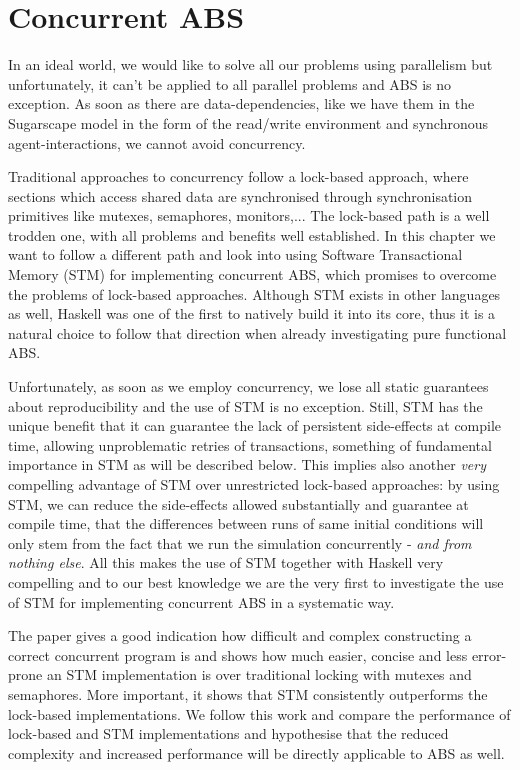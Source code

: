 \section{Concurrent ABS}
In an ideal world, we would like to solve all our problems using parallelism but unfortunately, it can't be applied to all parallel problems and ABS is no exception. As soon as there are data-dependencies, like we have them in the Sugarscape model in the form of the read/write environment and synchronous agent-interactions, we cannot avoid concurrency.

Traditional approaches to concurrency follow a lock-based approach, where sections which access shared data are synchronised through synchronisation primitives like mutexes, semaphores, monitors,... The lock-based path is a well trodden one, with all problems and benefits well established. In this chapter we want to follow a different path and look into using Software Transactional Memory (STM) for implementing concurrent ABS, which promises to overcome the problems of lock-based approaches. Although STM exists in other languages as well, Haskell was one of the first to natively build it into its core, thus it is a natural choice to follow that direction when already investigating pure functional ABS.

Unfortunately, as soon as we employ concurrency, we lose all static guarantees about reproducibility and the use of STM is no exception. Still, STM has the unique benefit that it can guarantee the lack of persistent side-effects at compile time, allowing unproblematic retries of transactions, something of fundamental importance in STM as will be described below. This implies also another \textit{very} compelling advantage of STM over unrestricted lock-based approaches: by using STM, we can reduce the side-effects allowed substantially and guarantee at compile time, that the differences between runs of same initial conditions will only stem from the fact that we run the simulation concurrently - \textit{and from nothing else}. All this makes the use of STM together with Haskell very compelling and to our best knowledge we are the very first to investigate the use of STM for implementing concurrent ABS in a systematic way.

The paper \cite{discolo_lock_2006} gives a good indication how difficult and complex constructing a correct concurrent program is and shows how much easier, concise and less error-prone an STM implementation is over traditional locking with mutexes and semaphores. More important, it shows that STM consistently outperforms the lock-based implementations. We follow this work and compare the performance of lock-based and STM implementations and hypothesise that the reduced complexity and increased performance will be directly applicable to ABS as well.

